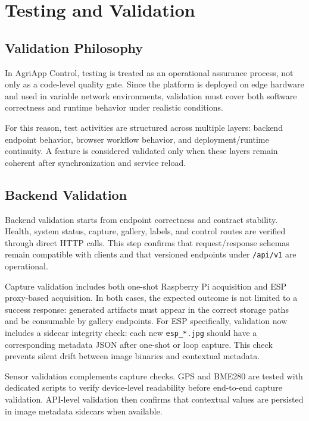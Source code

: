 \section{Testing and Validation}

\subsection{Validation Philosophy}
In AgriApp Control, testing is treated as an operational assurance process, not only as a code-level quality gate. Since the platform is deployed on edge hardware and used in variable network environments, validation must cover both software correctness and runtime behavior under realistic conditions.

For this reason, test activities are structured across multiple layers: backend endpoint behavior, browser workflow behavior, and deployment/runtime continuity. A feature is considered validated only when these layers remain coherent after synchronization and service reload.

\subsection{Backend Validation}
Backend validation starts from endpoint correctness and contract stability. Health, system status, capture, gallery, labels, and control routes are verified through direct HTTP calls. This step confirms that request/response schemas remain compatible with clients and that versioned endpoints under \texttt{/api/v1} are operational.

Capture validation includes both one-shot Raspberry Pi acquisition and ESP proxy-based acquisition. In both cases, the expected outcome is not limited to a success response: generated artifacts must appear in the correct storage paths and be consumable by gallery endpoints.
For ESP specifically, validation now includes a sidecar integrity check: each new \texttt{esp\_*.jpg} should have a corresponding metadata JSON after one-shot or loop capture. This check prevents silent drift between image binaries and contextual metadata.

Sensor validation complements capture checks. GPS and BME280 are tested with dedicated scripts to verify device-level readability before end-to-end capture validation. API-level validation then confirms that contextual values are persisted in image metadata sidecars when available.

